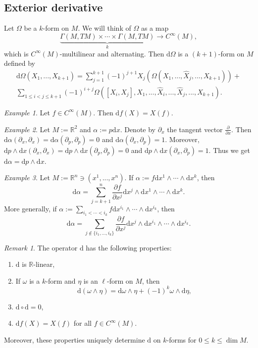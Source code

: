 \documentclass[12pt]{amsart}
\numberwithin{equation}{section}
\theoremstyle{plain}
\theoremstyle{definition}
\theoremstyle{remark}
\newtheorem{rem}{Remark}[subsection]
\newtheorem{ex}{Example}[subsection]
\newcommand{\R}{\mathbb{R}}
\newcommand{\dd}{{\mathrm{d}}}
\begin{document}
\subsection{Exterior derivative}
Let $\Omega$ be a $k$-form on $M$. We will think of $\Omega$ as a map $$\underbrace{\Gamma(M,TM)\times\dotsm \times \Gamma(M,TM)}_{k}\to C^\infty(M),$$ which is $C^\infty(M)$-multilinear and alternating. Then $\dd \Omega$ is a $(k+1)$-form on $M$ defined by 
\begin{multline*}
\dd\Omega(X_1,...,X_{k+1})=\sum_{j=1}^{k+1}(-1)^{j+1}X_j(\Omega(X_1,...,\widehat{X}_j,...,X_{k+1}))+\\\sum_{1\leq i<j\leq k+1}(-1)^{i+j}\Omega([X_i,X_j],X_1,...,\widehat{X}_i,...,\widehat{X}_j,...,X_{k+1}).
\end{multline*}

\begin{ex}
Let $f\in C^\infty(M)$. Then $\dd f(X)=X(f)$.
\end{ex}

\begin{ex}
Let $M:=\R^2$ and $\alpha:=p\dd x$. Denote by $\partial_x$ the tangent vector $\frac{\partial}{\partial x}$.
Then $\dd\alpha(\partial_{x},\partial_x)=\dd\alpha(\partial_p,\partial_p)=0$ and $\dd\alpha(\partial_x,\partial_p)=1$. Moreover, $\dd p\land\dd x(\partial_x,\partial_x)=\dd p\land\dd x(\partial_p,\partial_p)=0$ and $\dd p\land\dd x(\partial_x,\partial_p)=1$. Thus we get $\dd\alpha=\dd p\land\dd x$.
\end{ex}

\begin{ex}
Let $M:=\R^n\ni(x^1,...,x^n)$. If $\alpha:=f\dd x^1\land\dotsm \land \dd x^k$, then $$\dd\alpha=\sum_{j=k+1}^n\frac{\partial f}{\partial x^j}\dd x^j\land \dd x^1\land\dotsm\land \dd x^k.$$ More generally, if $\alpha:=\sum_{i_1<\dotsm <i_k}f\dd x^{i_1}\land\dotsm \land \dd x^{i_k}$, then $$\dd\alpha=\sum_{j\not\in\{i_1,...,i_k\}}\frac{\partial f}{\partial x^j}\dd x^j\land \dd x^{i_1}\land\dotsm\land \dd x^{i_k}.$$
\end{ex}

\begin{rem}
The operator $\dd$ has the following properties:
\begin{enumerate}
\item{$\dd$ is $\R$-linear,}
\item{If $\omega$ is a $k$-form and $\eta$ is an $\ell$-form on $M$, then $$\dd(\omega\land\eta)=\dd\omega\land\eta+(-1)^k\omega\land \dd\eta,$$
}
\item{$\dd\circ \dd=0$,}
\item{$\dd f(X)=X(f)$ for all $f\in C^\infty(M)$.}
\end{enumerate}
Moreover, these properties uniquely determine $\dd$ on $k$-forms for $0\leq k\leq \dim M$.
\end{rem}
\end{document}
